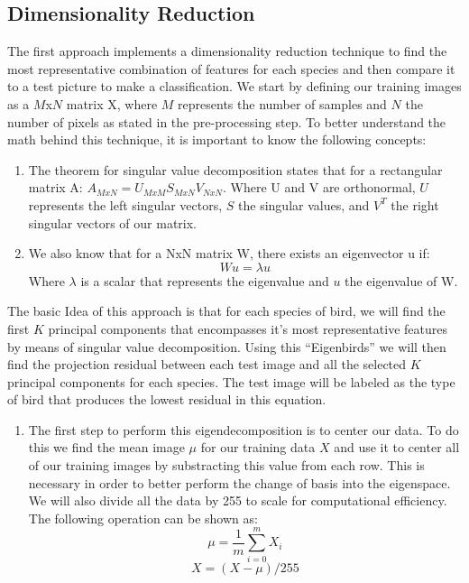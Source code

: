 \documentclass[11pt]{article}
\begin{document}
\begin{singlespace}
\subsection{Dimensionality Reduction}
The first approach implements a dimensionality reduction technique to find the most representative combination of features for each species and then compare it to a test picture to make a classification. We start by defining our training images as a $M$x$N$ matrix X, where $M$ represents the number of samples and $N$ the number of pixels as stated in the pre-processing step. To better understand the math behind this technique, it is important to know the following concepts: \\

\begin{enumerate}
\item The theorem for singular value decomposition states that for a rectangular matrix A: $ A_{MxN} = U_{MxM}S_{MxN}V_{NxN}$. Where U and V are orthonormal, $U$ represents the left singular vectors, $S$ the singular values, and $V^T$ the right singular vectors of our matrix.
\item We also know that for a NxN matrix W, there exists an eigenvector u if:
$$ Wu = \lambda u $$ 
Where $\lambda$ is a scalar that represents the eigenvalue and $u$ the eigenvalue of W. \\
\end{enumerate}

The basic Idea of this approach is that for each species of bird, we will find the first $K$ principal components that encompasses it's most representative features by means of singular value decomposition. Using this ``Eigenbirds'' we will then find the projection residual between each test image and all the selected $K$ principal components for each species. The test image will be labeled as the type of bird that produces the lowest residual in this equation. \\

\begin{enumerate}
\item The first step to perform this eigendecomposition is to center our data. To do this we find the mean image $\mu$ for our training data $X$ and use it to center all of our training images by substracting this value from each row. This is necessary in order to better perform the change of basis into the eigenspace. We will also divide all the data by 255 to scale for computational efficiency. The following operation can be shown as:
$$ \mu = \frac{1}{m}\sum_{i=0}^{m}X_i $$
$$ X = (X-\mu)/255 $$


\end{enumerate}
\end{singlespace}
\end{document}
